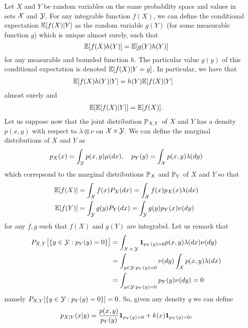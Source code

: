 Let $X$ and $Y$ be random variables on the same probability space and values in sets $\cX$ and $\cY$.
For any integrable function $f(X)$, we can define the conditional expectation $\E [f(X) | Y]$ as the random variable $g(Y)$ (for some measurable function $g$) which is unique almost surely, such that
\begin{equation}
	\E[f(X) h(Y)] = \E[ g(Y) h(Y)]
\end{equation}
for any measurable and bounded function $h$.
The particular value $g(y)$ of this conditional expectation is denoted $\E[f(X) | Y = y]$. 
In particular, we have that
\begin{align*}
	\E[f(X) h(Y) | Y] &= h(Y) \E[ f(X) | Y]
\end{align*}
almost surely and
\begin{align}
	\E [\E[ f(X) | Y]] = \E[f(X)].
\end{align}
Let us suppose now that the joint distribution $\P_{X, Y}$ of $X$ and $Y$ has a density $p(x, y)$ with respect to $\lambda \otimes \nu$ on $\cX \times \cY$.
We can define the marginal distributions of $X$ and $Y$ as
\begin{equation*}
	p_X(x) = \int_{\cY} p(x, y) \mu(dx), \quad
	p_Y(y) = \int_{\cX} p(x, y) \lambda(dy)
\end{equation*}
which correpsond to the marginal distributions $\P_X$ and $\P_Y$ of $X$ and $Y$ so that
\begin{align*}
	\E[f(X)] &= \int_{\cX} f(x) P_X(dx) = \int_{\cX} f(x) p_X(x) \lambda(dx) \\ 
	\E[f(Y)] &= \int_{\cY} g(y) P_Y(dx) = \int_{\cY} g(y) p_Y(x) \nu(dy)
\end{align*}
for any $f, g$ such that $f(X)$ and $g(Y)$ are integrabel. 
Let us remark that
\begin{align*}
	P_{X, Y} \big[ \{ y \in \cY : p_Y(y) = 0 \} \big] &= \int_{\cX \times \cY} \ind{p_Y(y) = 0} p(x, y) \lambda(dx) \nu(dy) \\
	&= \int_{y \in \cY : p_Y(y) = 0} \nu(dy) \int_{\cX} p(x, y) \lambda (dx) \\
	&= \int_{y \in \cY : p_Y(y) = 0} p_Y(y) \nu(dy) = 0
\end{align*}
namely $P_{X, Y}[ \{ y \in \cY : p_Y(y) = 0 \}] = 0$.
So, given any density $q$ we can define
\begin{equation*}
	p_{X | Y}(x | y) = \frac{p(x, y)}{p_Y(y)} \ind{p_Y(y) > 0} + k(x) \ind{p_Y(y) = 0},
\end{equation*}
